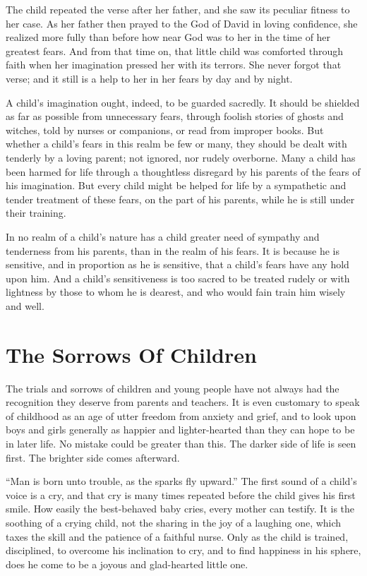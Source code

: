 \documentclass[
]{book}
\begin{document}
The child repeated the verse after her father, and she saw its peculiar fitness to her case. As her father then prayed to the God of David in loving confidence, she realized more fully than before how near God was to her in the time of her greatest fears. And from that time on, that little child was comforted through faith when her imagination pressed her with its terrors. She never forgot that verse; and it still is a help to her in her fears by day and by night.

A child's imagination ought, indeed, to be guarded sacredly. It should be shielded as far as possible from unnecessary fears, through foolish stories of ghosts and witches, told by nurses or companions, or read from improper books. But whether a child's fears in this realm be few or many, they should be dealt with tenderly by a loving parent; not ignored, nor rudely overborne. Many a child has been harmed for life through a thoughtless disregard by his parents of the fears of his imagination. But every child might be helped for life by a sympathetic and tender treatment of these fears, on the part of his parents, while he is still under their training.

In no realm of a child's nature has a child greater need of sympathy and tenderness from his parents, than in the realm of his fears. It is because he is sensitive, and in proportion as he is sensitive, that a child's fears have any hold upon him. And a child's sensitiveness is too sacred to be treated rudely or with lightness by those to whom he is dearest, and who would fain train him wisely and well.

\hypertarget{the-sorrows-of-children}{%
\chapter{The Sorrows Of Children}\label{the-sorrows-of-children}}

The trials and sorrows of children and young people have not always had the recognition they deserve from parents and teachers. It is even customary to speak of childhood as an age of utter freedom from anxiety and grief, and to look upon boys and girls generally as happier and lighter-hearted than they can hope to be in later life. No mistake could be greater than this. The darker side of life is seen first. The brighter side comes afterward.

``Man is born unto trouble, as the sparks fly upward.'' The first sound of a child's voice is a cry, and that cry is many times repeated before the child gives his first smile. How easily the best-behaved baby cries, every mother can testify. It is the soothing of a crying child, not the sharing in the joy of a laughing one, which taxes the skill and the patience of a faithful nurse. Only as the child is trained, disciplined, to overcome his inclination to cry, and to find happiness in his sphere, does he come to be a joyous and glad-hearted little one.
\end{document}
